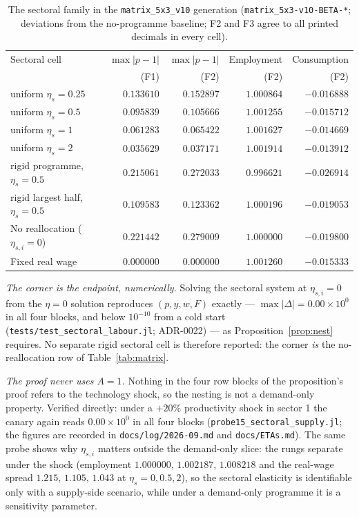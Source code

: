 \begin{table}[htbp]
\centering
\caption{The sectoral family in the \texttt{matrix\_5x3\_v10} generation
(\texttt{matrix\_5x3-v10-BETA-*}; deviations from the no-programme baseline;
F2 and F3 agree to all printed decimals in every cell).}
\label{tab:sectoral}
\begin{tabular}{lrrrr}
\toprule
Sectoral cell & $\max|p-1|$ & $\max|p-1|$ & Employment & Consumption \\
 & (F1) & (F2) & (F2) & (F2) \\
\midrule
uniform $\eta_s = 0.25$ & $0.133610$ & $0.152897$ & $1.000864$ & $-0.016888$ \\
uniform $\eta_s = 0.5$  & $0.095839$ & $0.105666$ & $1.001255$ & $-0.015712$ \\
uniform $\eta_s = 1$    & $0.061283$ & $0.065422$ & $1.001627$ & $-0.014669$ \\
uniform $\eta_s = 2$    & $0.035629$ & $0.037171$ & $1.001914$ & $-0.013912$ \\
\midrule
rigid programme, $\eta_s = 0.5$ & $0.215061$ & $0.272033$ & $0.996621$ & $-0.026914$ \\
rigid largest half, $\eta_s = 0.5$ & $0.109583$ & $0.123362$ & $1.000196$ & $-0.019053$ \\
\midrule
No reallocation ($\eta_{s,i} = 0$) & $0.221442$ & $0.279009$ & $1.000000$ & $-0.019800$ \\
Fixed real wage & $0.000000$ & $0.000000$ & $1.001260$ & $-0.015333$ \\
\bottomrule
\end{tabular}
\end{table}

\emph{The corner is the endpoint, numerically.} Solving the sectoral system at
$\eta_{s,i} = 0$ from the $\eta = 0$ solution reproduces $(p, y, w, F)$ exactly
--- $\max|\Delta| = 0.00 \times 10^0$ in all four blocks, and below $10^{-10}$
from a cold start (\texttt{tests/test\_sectoral\_labour.jl};
ADR-0022) --- as Proposition~\ref{prop:nest} requires. No separate
rigid sectoral cell is therefore reported: the corner \emph{is} the
no-reallocation row of
Table~\ref{tab:matrix}.

\emph{The proof never uses $A = 1$.} Nothing in the four row blocks of the
proposition's proof refers to the technology shock, so the nesting is not a
demand-only property. Verified directly: under a $+20\%$ productivity shock in
sector 1 the canary again reads $0.00 \times 10^0$ in all four blocks
(\texttt{probe15\_sectoral\_supply.jl}; the figures are
recorded in \texttt{docs/log/2026-09.md} and \texttt{docs/ETAs.md}). The same probe shows why $\eta_{s,i}$
matters outside the demand-only slice: the rungs separate under the shock
(employment $1.000000$, $1.002187$, $1.008218$ and the real-wage spread
$1.215$, $1.105$, $1.043$ at $\eta_s = 0, 0.5, 2$), so the sectoral elasticity
is identifiable only with a supply-side scenario, while under a demand-only
programme it is a sensitivity parameter.


